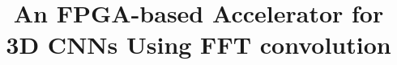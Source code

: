 \documentclass[
  10pt,
  journal,
  \FORMAT-MODE,
  \TWOSIDE-MODE
]{IEEEtran}
\begin{document}

\title{An FPGA-based Accelerator for 3D CNNs Using FFT convolution}
\author{}

\makeatletter
\makeatother



\maketitle
\IEEEdisplaynontitleabstractindextext






\end{document}
